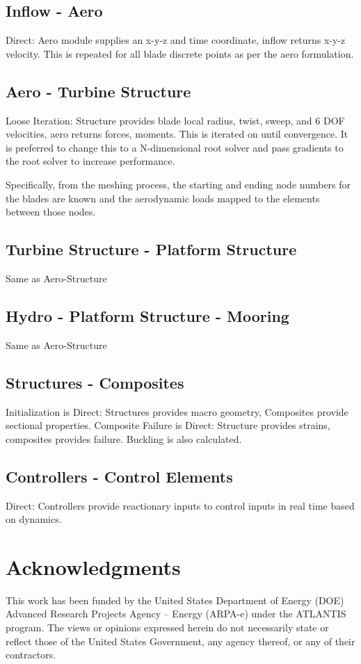\documentclass[11pt]{article}
\begin{document}
\subsection{Inflow - Aero}
Direct: Aero module supplies an x-y-z and time coordinate, inflow returns x-y-z velocity.  This is repeated for all blade discrete points as per the aero formulation.
\subsection{Aero - Turbine Structure}
Loose Iteration: Structure provides blade local radius, twist, sweep, and 6 DOF velocities, aero returns forces, moments. This is iterated on until convergence.  It is preferred to change this to a N-dimensional root solver and pass gradients to the root solver to increase performance.

Specifically, from the meshing process, the starting and ending node numbers for the blades are known and the aerodynamic loads mapped to the elements between those nodes.

\subsection{Turbine Structure - Platform Structure}
Same as Aero-Structure
\subsection{Hydro - Platform Structure - Mooring}
Same as Aero-Structure
\subsection{Structures - Composites}
Initialization is Direct: Structures provides macro geometry, Composites provide sectional properties. Composite Failure is Direct: Structure provides strains, composites provides failure.  Buckling is also calculated.
\subsection{Controllers - Control Elements}
Direct: Controllers provide reactionary inputs to control inputs in real time based on dynamics.

\section*{Acknowledgments}
This work has been funded by the United States Department of Energy (DOE) Advanced Research Projects Agency – Energy (ARPA-e) under the ATLANTIS program. The views or opinions expressed herein do not necessarily state or reflect those of the United States Government, any agency thereof, or any of their contractors.


\end{document}

